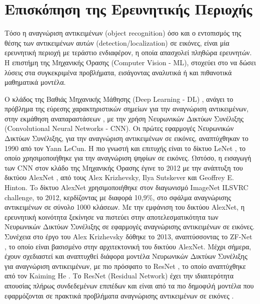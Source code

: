 \chapter{Επισκόπηση της Ερευνητικής Περιοχής}
\label{chapter:sota}
Τόσο η αναγνώριση αντικειμένων (object recognition) όσο και ο εντοπισμός
της θέσης των αντικειμένων αυτών (detection/localization) σε εικόνες,
είναι μία ερευνητική περιοχή με τεράστιο ενδιαφέρον,
η οποία απασχολεί πληθώρα ερευνητών. Η επιστήμη της Μηχανικής Όρασης (Computer Vision - ML), %
στοχεύει στο να δώσει λύσεις στα συγκεκριμένα προβλήματα, εισάγοντας αναλυτικά
ή και πιθανοτικά μαθηματικά μοντέλα.

Ο κλάδος της Βαθιάς Μηχανικής Μάθησης (Deep Learning - DL) \cite{Goodfellow-et-al-2016-Book},
ανάγει το πρόβλημα της εύρεσης χαρακτηριστικών σημείων για την αναγνώριση αντικειμένων,
στην εκμάθηση αναπαραστάσεων \cite{bengio2013representation},
με την χρήση Νευρωνικών Δικτύων Συνέλιξης (Convolutional Neural Networks - CNN). %
Οι πρώτες εφαρμογές Νευρωνικών Δικτύων Συνέλιξης, για την αναγνώριση αντικειμένων
σε εικόνες, αναπτύχθηκαν το 1990 από τον Yann LeCun.
Η πιο γνωστή και επιτυχής είναι το δίκτυο LeNet \cite{lecun1998gradient}, το οποίο
χρησιμοποιήθηκε για την αναγνώριση ψηφίων σε εικόνες.
Ωστόσο, η εισαγωγή των CNN στον κλάδο της Μηχανικής Όρασης έγινε το 2012 με
την ανάπτυξη του δικτύου AlexNet \cite{NIPS2012_4824}, από τους Alex Krizhevsky,
Ilya Sutskever και Geoffrey E. Hinton. To δίκτυο AlexNet χρησιμοποιήθηκε
στον διαγωνισμό ImageNet ILSVRC challenge, το 2012, κερδίζοντας με διαφορά
10,9\%, στο σφάλμα αναγνώρισης αντικειμένων σε σύνολο 1000 κλάσεων.
Με την εμφάνιση του δικτύου AlexNet, η ερευνητική κοινότητα ξεκίνησε να
πιστεύει στην αποτελεσματικότητα των Νευρωνικών Δικτύων Συνέλιξης σε εφαρμογές αναγνώρισης
αντικειμένων σε εικόνες. Συνέχεια στο έργο του Alex Krizhevsky δόθηκε το 2013,
αναπτύσσοντας το ZF-Net \cite{DBLP:journals/corr/ZeilerF13}, το οποίο είναι
βασισμένο στην αρχιτεκτονική του δικτύου AlexNet. Μέχρι σήμερα, έχουν σχεδιαστεί
και αναπτυχθεί διάφορα μοντέλα Νευρωνικών Δικτύων Συνέλιξης για
αναγνώριση αντικειμένων, με πιο πρόσφατο το ResNet ,
το οποίο αναπτύχθηκε από τον Kaiming He \cite{DBLP:journals/corr/HeZRS15}.
Το ResNet (Residual Network) έχει την
ιδιαιτερότητα απουσίας πλήρως συνδεδεμένων επιπέδων και είναι από τα πιο δημοφιλή
μοντέλα που εφαρμόζονται σε πρακτικά προβλήματα αναγνώρισης αντικειμένων σε
εικόνες \cite{DBLP:journals/corr/HeZR016}.

